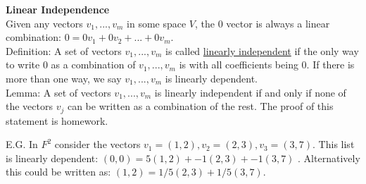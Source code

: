 \documentclass{article}
\begin{document}
\textbf{Linear Independence} \\
Given any vectors $v_1, ..., v_m$ in some space $V$, the $0$ vector is always a linear combination: $0 = 0v_1 + 0v_2 + ... + 0v_m$. \\
Definition: A set of vectors $v_1, ..., v_m$ is called \underline{linearly independent} if the only way to write $0$ as a combination of $v_1, ..., v_m$ is with all coefficients being $0$. If there is more than one way, we say $v_1, ..., v_m$ is linearly dependent. \\

Lemma: A set of vectors $v_1, ..., v_m$ is linearly independent if and only if none of the vectors $v_j$ can be written as a combination of the rest. The proof of this statement is homework. 

E.G. In $F^2$ consider the vectors $v_1 = (1,2), v_2 = (2,3), v_3 = (3,7)$. This list is linearly dependent: $(0,0) = 5(1,2) + -1(2,3) + -1(3,7)$ . Alternatively this could be written as: $(1,2) = 1/5(2,3) + 1/5(3,7)$. \\
\end{document}
